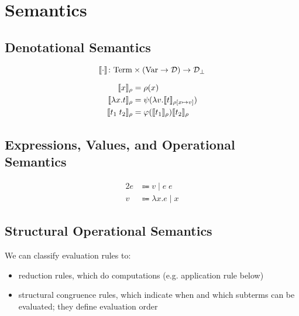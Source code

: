\usetikzlibrary{shapes}

\chapter{Semantics}

\section{Denotational Semantics}

\[
\llbracket\cdot\rrbracket \colon
  \mathrm{Term} \times (\mathrm{Var} \rightarrow \mathcal{D})
    \rightarrow \mathcal{D}_{\bot}
\]

\begin{alignat*}{2}
  \llbracket x\rrbracket_\rho & = \rho(x) \\
  \llbracket\lambda x.t\rrbracket_\rho & =
    \psi(\mathbf{\lambda} v. \llbracket t\rrbracket_{\rho [x \mapsto v]}) \\
  \llbracket t_1 \; t_2\rrbracket_\rho & =
    \varphi(\llbracket t_1\rrbracket_\rho) \llbracket t_2\rrbracket_\rho
\end{alignat*}

\section{Expressions, Values, and Operational Semantics}

\begin{alignat*}{2}
  e & \Coloneqq v \mid e\;e         \tag{expressions} \\
  v & \Coloneqq \lambda x.e \mid x  \tag{values}
\end{alignat*}

\section{Structural Operational Semantics}

We can classify evaluation rules to:
\begin{itemize}
    \item reduction rules, which do computations (e.g. application rule below)
    \item structural congruence rules, which indicate when and which subterms can be evaluated;
        they define evaluation order
\end{itemize}

